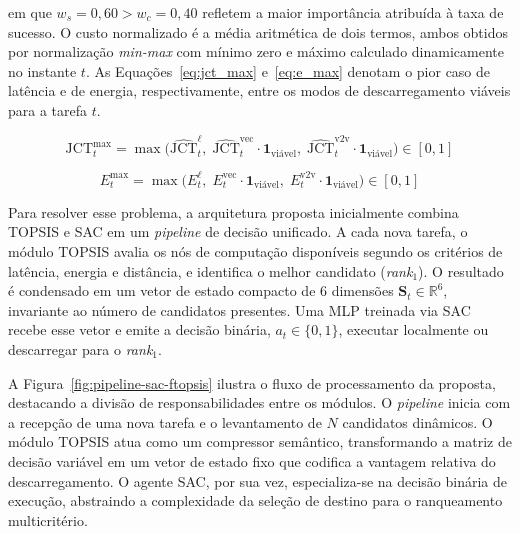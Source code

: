 \noindent em que $w_s = 0{,}60 > w_c = 0{,}40$ refletem a maior importância atribuída à taxa de sucesso. O custo normalizado é a média aritmética de dois termos, ambos obtidos por normalização \textit{min-max} com mínimo zero e máximo calculado dinamicamente no instante $t$. As Equações~\ref{eq:jct_max} e~\ref{eq:e_max} denotam o pior caso de latência e de energia, respectivamente, entre os modos de descarregamento viáveis para a tarefa $t$.

\begin{equation}
    \text{JCT}^{\max}_t = \max\!\bigl(\widehat{\text{JCT}}^{\ell}_t,\; \widehat{\text{JCT}}^{\text{vec}}_t \cdot \mathbf{1}_{\text{viável}},\; \widehat{\text{JCT}}^{\text{v2v}}_t \cdot \mathbf{1}_{\text{viável}}\bigr) \in [0, 1]
    \label{eq:jct_max}
\end{equation}

\begin{equation}
    E^{\text{max}}_t = \max\!\bigl(E^{\ell}_t,\; E^{\text{vec}}_t \cdot \mathbf{1}_{\text{viável}},\; E^{\text{v2v}}_t \cdot \mathbf{1}_{\text{viável}}\bigr) \in [0, 1]
    \label{eq:e_max}
\end{equation}

Para resolver esse problema, a arquitetura proposta inicialmente combina \gls{TOPSIS} e \gls{SAC} em um \textit{pipeline} de decisão unificado. A cada nova tarefa, o módulo \gls{TOPSIS} avalia os nós de computação disponíveis segundo os critérios de latência, energia e distância, e identifica o melhor candidato (\textit{rank}$_1$). O resultado é condensado em um vetor de estado compacto de 6 dimensões $\mathbf{S}_t \in \mathbb{R}^6$, invariante ao número de candidatos presentes. Uma \gls{MLP} treinada via \gls{SAC} recebe esse vetor e emite a decisão binária, $a_t \in \{0, 1\}$, executar localmente ou descarregar para o \textit{rank}$_1$. 

A Figura~\ref{fig:pipeline-sac-ftopsis} ilustra o fluxo de processamento da proposta, destacando a divisão de responsabilidades entre os módulos. O \textit{pipeline} inicia com a recepção de uma nova tarefa e o levantamento de $N$ candidatos dinâmicos. O módulo \gls{TOPSIS} atua como um compressor semântico, transformando a matriz de decisão variável em um vetor de estado fixo que codifica a vantagem relativa do descarregamento. O agente \gls{SAC}, por sua vez, especializa-se na decisão binária de execução, abstraindo a complexidade da seleção de destino para o ranqueamento multicritério.

